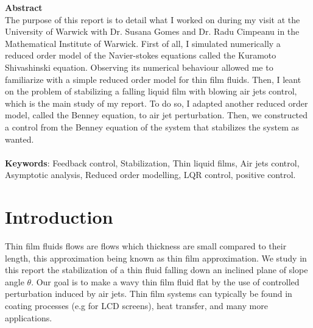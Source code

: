 \documentclass[12pt]{article}
\begin{document}
{\large \textbf{Abstract}} \\
{\normalsize The purpose of this report is to detail what I worked on during my visit at the University of Warwick with Dr. Susana Gomes and Dr. Radu Cimpeanu in the Mathematical Institute of Warwick. First of all, I simulated numerically a reduced order model of the Navier-stokes equations called the Kuramoto Shivashinski equation. Observing its numerical behaviour allowed me to familiarize with a simple reduced order model for thin film fluids. Then, I leant on the problem of stabilizing a falling liquid film with blowing air jets control, which is the main study of my report. To do so, I adapted another reduced order model, called the Benney equation, to air jet perturbation. Then, we constructed a control from the Benney equation of the system that stabilizes the system as wanted.} \\
\vspace{0.8cm} \\
{\large \textbf{Keywords}: \normalsize Feedback control, Stabilization, Thin liquid films, Air jets control, Asymptotic analysis, Reduced order modelling, LQR control, positive control.}


\newpage
\tableofcontents
\newpage



\section{Introduction}
Thin film fluids flows are flows which thickness are small compared to their length, this approximation being known as
 thin film approximation. We study in this report the stabilization of a thin fluid falling down an inclined plane of 
 slope angle $\theta$. Our goal is to make  a wavy thin film fluid flat by the use of controlled perturbation 
 induced by air jets. Thin film systems can typically be found in coating processes (e.g for LCD screens), heat transfer,
  and many more applications.\\
\end{document}
